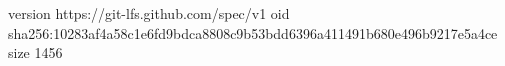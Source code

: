 version https://git-lfs.github.com/spec/v1
oid sha256:10283af4a58c1e6fd9bdca8808c9b53bdd6396a411491b680e496b9217e5a4ce
size 1456
